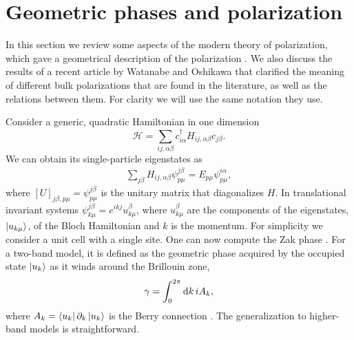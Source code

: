 \documentclass[twocolumn,amsmath,longbibliography,amssymb,superscriptaddress]{revtex4-1}
\begin{document}
\section{Geometric phases and polarization}

In this section we review some aspects of the modern theory of polarization, which gave a geometrical description of the polarization \cite{Resta1992,KingSmith1993,Vanderbilt1993,Resta1997}. 
We also discuss the results of a recent article by Watanabe and Oshikawa \cite{Watanabe2018} that clarified the meaning of different bulk polarizations that are found in the literature, as well as the relations between them. For clarity we will use the same notation they use. 

Consider a generic, quadratic Hamiltonian in one dimension
\begin{equation}\label{eq:quadr_Ham}
\mathcal{H} = \sum_{ij,\alpha\beta} c_{i\alpha}^\dagger H_{ij,\alpha \beta}c_{j\beta}.
\end{equation}
We can obtain its single-particle eigenstates as
\begin{align}
\sum_{j\beta}H_{ij,\alpha\beta} \psi_{p\mu}^{j\beta} = E_{p\mu} \psi^{i\alpha}_{p\mu},
\end{align}
where $[U]_{j\beta,p\mu} = \psi_{p\mu}^{j\beta}$ is the unitary matrix that diagonalizes $H$. In translational invariant systems $\psi_{k\mu}^{j\beta} = e^{ikj}u_{k \mu}^{\beta}$, where $u_{k \mu}^{\beta}$ are the components of the eigenstates, $\ket{u_{k\mu}}$, of the Bloch Hamiltonian and $k$ is the momentum. For simplicity we consider a unit cell with a single site. One can now compute the Zak phase \cite{Zak1989}.
 For a two-band  model, it is defined as the geometric phase acquired by the occupied state $\ket{u_k}$ as it winds around the Brillouin zone,
\begin{equation}
\gamma = \int_{0}^{2\pi} {\rm d}k\, i A_k, 
\label{eq:zak_phase}
\end{equation}
where $A_k = \bra{u_k}\partial_k \ket{u_k}$ is the Berry connection \cite{Berry1984}. 
The generalization to higher-band models is straightforward. 
\end{document}
